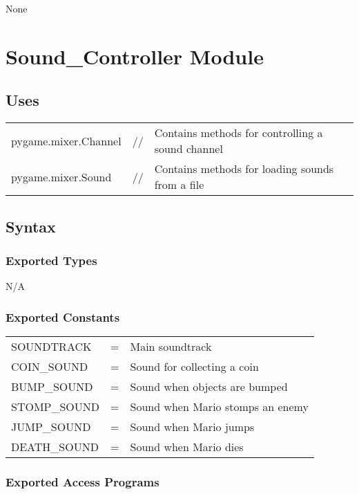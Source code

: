 \documentclass[12pt]{article}
\begin{document}
None
\newpage

\section* {Sound\_Controller Module}

\subsection* {Uses}

\begin{tabular}{lll}
    pygame.mixer.Channel & // & Contains methods for controlling a sound channel\\
    pygame.mixer.Sound   & // & Contains methods for loading sounds from a file
\end{tabular}
\subsection* {Syntax}

\subsubsection* {Exported Types}

N/A

\subsubsection* {Exported Constants}

\begin{tabular}{lll}
    SOUNDTRACK   & = & Main soundtrack\\
    COIN\_SOUND  & = & Sound for collecting a coin\\
    BUMP\_SOUND  & = & Sound when objects are bumped\\
    STOMP\_SOUND & = & Sound when Mario stomps an enemy\\
    JUMP\_SOUND  & = & Sound when Mario jumps\\
    DEATH\_SOUND & = & Sound when Mario dies
\end{tabular}
\subsubsection* {Exported Access Programs}
\end{document}
